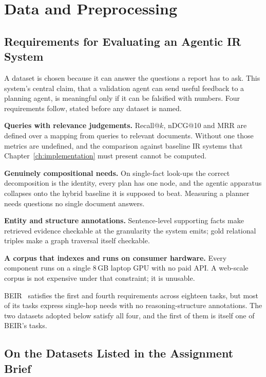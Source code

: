 \chapter{Data and Preprocessing}
\label{ch:data}

\section{Requirements for Evaluating an Agentic IR System}
\label{sec:data-requirements}

A dataset is chosen because it can answer the questions a report has to ask.
This system's central claim, that a validation agent can send useful feedback
to a planning agent, is meaningful only if it can be falsified with numbers.
Four requirements follow, stated before any dataset is named.

\textbf{Queries with relevance judgements.} Recall@$k$, nDCG@10 and MRR are
defined over a mapping from queries to relevant documents. Without one those
metrics are undefined, and the comparison against baseline IR systems that
Chapter~\ref{ch:implementation} must present cannot be computed.

\textbf{Genuinely compositional needs.} On single-fact look-ups the correct
decomposition is the identity, every plan has one node, and the agentic
apparatus collapses onto the hybrid baseline it is supposed to beat. Measuring
a planner needs questions no single document answers.

\textbf{Entity and structure annotations.} Sentence-level supporting facts make
retrieved evidence checkable at the granularity the system emits; gold
relational triples make a graph traversal itself checkable.

\textbf{A corpus that indexes and runs on consumer hardware.} Every component
runs on a single 8\,GB laptop GPU with no paid API. A web-scale corpus is not
expensive under that constraint; it is unusable.

BEIR~\cite{thakur2021beir} satisfies the first and fourth requirements across
eighteen tasks, but most of its tasks express single-hop needs with no
reasoning-structure annotations. The two datasets adopted below satisfy all
four, and the first of them is itself one of BEIR's tasks.

\section{On the Datasets Listed in the Assignment Brief}
\label{sec:table2}

